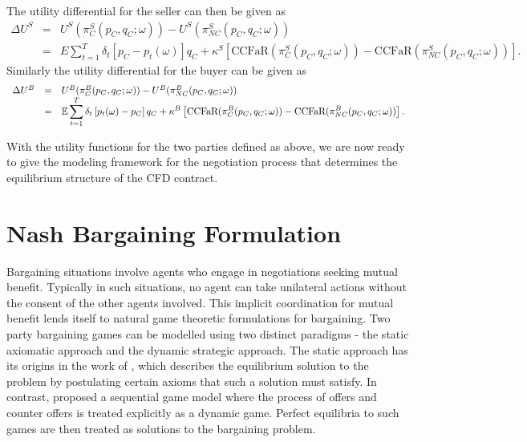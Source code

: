 The utility differential for the seller can then be given as 
\begin{equation} \label{util1}
\begin{array}{ccl}
\Delta U^S & = & U^S(\pi_C^S(p_C, q_C; \omega)) - U^S(\pi_{NC}^S(p_C, q_C; \omega)) \\
& = & E\displaystyle \sum_{t=1}^T \delta_t \left[p_C - p_t(\omega) \right]q_C + \kappa^S \left[\text{CCFaR}(\pi_C^S(p_C, q_C; \omega)) - \text{CCFaR}(\pi_{NC}^S(p_C, q_C; \omega))\right].
\end{array}
\end{equation}
\noindent Similarly the utility differential for the buyer can be given as 
\begin{equation} \label{util2}
\begin{array}{ccl}
\Delta U^B & = & U^B(\pi_C^B(p_C, q_C; \omega)) - U^B(\pi_{NC}^B(p_C, q_C; \omega)) \\
& = & \mathbb{E} \displaystyle \sum_{t=1}^T \delta_t \left[p_t(\omega) - p_C\right]q_C + \kappa^B \left[\text{CCFaR}(\pi_C^B(p_C, q_C; \omega)) - \text{CCFaR}(\pi_{NC}^B(p_C, q_C; \omega))\right].
\end{array}
\end{equation}

With the utility functions for the two parties defined as above, we are now ready to give the modeling framework for the negotiation process that determines the equilibrium structure of the CFD contract.

\section{Nash Bargaining Formulation}

Bargaining situations involve agents who engage in negotiations seeking mutual
benefit. Typically in such situations, no agent can take unilateral actions
without the consent of the other agents involved. This implicit coordination for
mutual benefit lends itself to natural game theoretic formulations for
bargaining. Two party bargaining games can be modelled using two distinct
paradigms - the static axiomatic approach and the dynamic strategic approach.
The static approach has its origins in the work of \cite{nash_bargaining_1950},
which describes the equilibrium solution to the problem by postulating certain
axioms that such a solution must satisfy. In contrast,
\cite{rubinstein1982perfect} proposed a sequential game model where the process
of offers and counter offers is treated explicitly as a dynamic game. Perfect
equilibria to such games are then treated
as solutions to the bargaining problem. 

